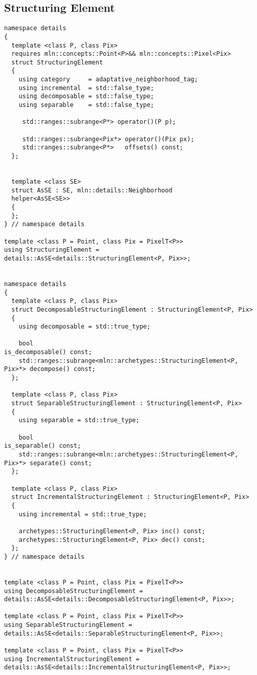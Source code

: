 \subsection{Structuring Element}

\begin{verbatim}
namespace details
{
  template <class P, class Pix>
  requires mln::concepts::Point<P>&& mln::concepts::Pixel<Pix>
  struct StructuringElement
  {
    using category     = adaptative_neighborhood_tag;
    using incremental  = std::false_type;
    using decomposable = std::false_type;
    using separable    = std::false_type;

     std::ranges::subrange<P*> operator()(P p);

     std::ranges::subrange<Pix*> operator()(Pix px);
     std::ranges::subrange<P*>   offsets() const;
  };


  template <class SE>
  struct AsSE : SE, mln::details::Neighborhood
  helper<AsSE<SE>>
  {
  };
} // namespace details

template <class P = Point, class Pix = PixelT<P>>
using StructuringElement = details::AsSE<details::StructuringElement<P, Pix>>;


namespace details
{
  template <class P, class Pix>
  struct DecomposableStructuringElement : StructuringElement<P, Pix>
  {
    using decomposable = std::true_type;

    bool                                                                is_decomposable() const;
    std::ranges::subrange<mln::archetypes::StructuringElement<P, Pix>*> decompose() const;
  };

  template <class P, class Pix>
  struct SeparableStructuringElement : StructuringElement<P, Pix>
  {
    using separable = std::true_type;

    bool                                                                is_separable() const;
    std::ranges::subrange<mln::archetypes::StructuringElement<P, Pix>*> separate() const;
  };

  template <class P, class Pix>
  struct IncrementalStructuringElement : StructuringElement<P, Pix>
  {
    using incremental = std::true_type;

    archetypes::StructuringElement<P, Pix> inc() const;
    archetypes::StructuringElement<P, Pix> dec() const;
  };
} // namespace details


template <class P = Point, class Pix = PixelT<P>>
using DecomposableStructuringElement = details::AsSE<details::DecomposableStructuringElement<P, Pix>>;

template <class P = Point, class Pix = PixelT<P>>
using SeparableStructuringElement = details::AsSE<details::SeparableStructuringElement<P, Pix>>;

template <class P = Point, class Pix = PixelT<P>>
using IncrementalStructuringElement = details::AsSE<details::IncrementalStructuringElement<P, Pix>>;
\end{verbatim}


